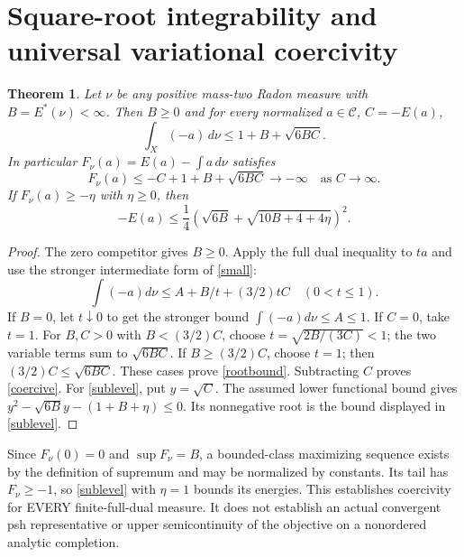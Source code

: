 \documentclass[11pt]{article}
\newtheorem{theorem}{Theorem}
\newcommand{\C}{\mathcal C}
\begin{document}
\section{Square-root integrability and universal variational coercivity}
\begin{theorem}\label{root}
Let $\nu$ be any positive mass-two Radon measure with
$B=E^*(\nu)<\infty$. Then $B\ge0$ and for every normalized
$a\in\C$, $C=-E(a)$,
\begin{equation}\label{rootbound}
 \int_X(-a)\,d\nu\le1+B+\sqrt{6BC}.
\end{equation}
In particular $F_\nu(a)=E(a)-\int a\,d\nu$ satisfies
\begin{equation}\label{coercive}
 F_\nu(a)\le-C+1+B+\sqrt{6BC}\longrightarrow-\infty
 \quad\text{as }C\longrightarrow\infty.
\end{equation}
If $F_\nu(a)\ge-\eta$ with $\eta\ge0$, then
\begin{equation}\label{sublevel}
 -E(a)\le\frac14\left(\sqrt{6B}+
                       \sqrt{10B+4+4\eta}\right)^2.
\end{equation}
\end{theorem}
\begin{proof}
The zero competitor gives $B\ge0$. Apply the full dual inequality
to $ta$ and use the stronger intermediate form of \eqref{small}:
\[
 \int(-a)d\nu\le A+B/t+(3/2)tC \quad(0<t\le1).
\]
If $B=0$, let $t\downarrow0$ to get the stronger bound
$\int(-a)d\nu\le A\le1$. If $C=0$, take $t=1$.
For $B,C>0$ with $B<(3/2)C$, choose
$t=\sqrt{2B/(3C)}<1$; the two variable terms sum to
$\sqrt{6BC}$. If $B\ge(3/2)C$, choose $t=1$;
then $(3/2)C\le\sqrt{6BC}$. These cases prove
\eqref{rootbound}. Subtracting $C$ proves \eqref{coercive}.
For \eqref{sublevel}, put $y=\sqrt C$. The assumed lower
functional bound gives $y^2-\sqrt{6B}y-(1+B+\eta)\le0$.
Its nonnegative root is the bound displayed in \eqref{sublevel}.
\end{proof}

Since $F_\nu(0)=0$ and $\sup F_\nu=B$, a bounded-class maximizing
sequence exists by the definition of supremum and may be normalized by
constants. Its tail has $F_\nu\ge-1$, so \eqref{sublevel} with
$\eta=1$ bounds its energies. This establishes coercivity for EVERY
finite-full-dual measure. It does not establish an actual convergent
psh representative or upper semicontinuity of the objective on a
nonordered analytic completion.
\end{document}
